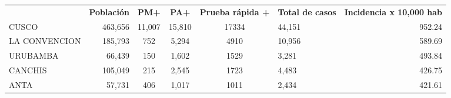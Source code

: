 \begin{tabular}{lrccclr}
	\rowcolor[HTML]{DCE6F1} 
	\multicolumn{1}{c}{\cellcolor[HTML]{DCE6F1}\textbf{PROVINCIA}} & \multicolumn{1}{c}{\cellcolor[HTML]{DCE6F1}\textbf{Población}} & \textbf{PM+}                                                & \textbf{PA+}         & \textbf{Prueba rápida +} & \multicolumn{1}{c}{\cellcolor[HTML]{DCE6F1}\textbf{Total de casos}} & \multicolumn{1}{c}{\cellcolor[HTML]{DCE6F1}\textbf{Incidencia x 10,000 hab}} \\
	\cellcolor[HTML]{FF5050}CUSCO                                  & 463,656                                                        & 11,007                                                      & 15,810               & 17334                    & 44,151                                                              & 952.24                                                                       \\
	\cellcolor[HTML]{F4B084}LA   CONVENCION                        & 185,793                                                        & 752                                                         & 5,294                & 4910                     & 10,956                                                              & 589.69                                                                       \\
	\cellcolor[HTML]{F4B084}URUBAMBA                               & 66,439                                                         & 150                                                         & 1,602                & 1529                     & 3,281                                                               & 493.84                                                                       \\
	\cellcolor[HTML]{FFE699}CANCHIS                                & 105,049                                                        & 215                                                         & 2,545                & 1723                     & 4,483                                                               & 426.75                                                                       \\
	\cellcolor[HTML]{FFE699}ANTA                                   & 57,731                                                         & 406                                                         & 1,017                & 1011                     & 2,434                                                               & 421.61                                                                       \\

\end{tabular}
